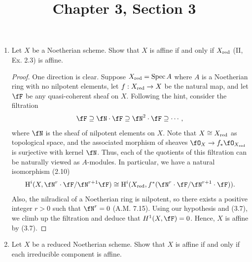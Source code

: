 \documentclass[a4paper]{article}
\title{Chapter 3, Section 3}
\begin{document}
\maketitle

\begin{enumerate} [label=\textbf{\arabic*.}, leftmargin=0em]

  \item[1.] Let $X$ be a Noetherian scheme.
        Show that $X$ is affine if and only if ${X}_\text{red}$ (II, Ex. 2.3) is affine.

        \begin{proof}
          One direction is clear.
          Suppose ${X}_\text{red} = \operatorname{Spec}{A}$ where $A$ is a Noetherian ring with no nilpotent elements, let $f : {X}_\text{red} \to X$ be the natural map, and let $\fF$ be any quasi-coherent sheaf on $X$.
          Following the hint, consider the filtration
          \begin{equation*}
            \fF \supseteq \fN \cdot \fF \supseteq \fN^2 \cdot \fF \supseteq \cdots,
          \end{equation*}
          where $\fN$ is the sheaf of nilpotent elements on $X$.
          Note that $X \cong {X}_\text{red}$ as topological space, and the associated morphism of sheaves $\fO_X \to f_* \fO_{\red{X}}$ is surjective with kernel $\fN$.
          Thus, each of the quotients of this filtration can be naturally viewed as $A$-modules.
          In particular, we have a natural isomorphism (2.10) $$\cH^i(X, \fN^r \cdot \fF / \fN^{r + 1} \fF) \cong \cH^i(\red{X}, f^*(\fN^r \cdot \fF / \fN^{r + 1} \cdot \fF)).$$
          Also, the nilradical of a Noetherian ring is nilpotent, so there exists a positive integer $r > 0$ such that $\fN^r = 0$ (A.M. 7.15).
          Using our hypothesis and (3.7), we climb up the filtration and deduce that $H^1(X, \fF) = 0$.
          Hence, $X$ is affine by (3.7).
        \end{proof}

  \item[2.] Let $X$ be a reduced Noetherian scheme.
        Show that $X$ is affine if and only if each irreducible component is affine.


\end{enumerate}
\end{document}
